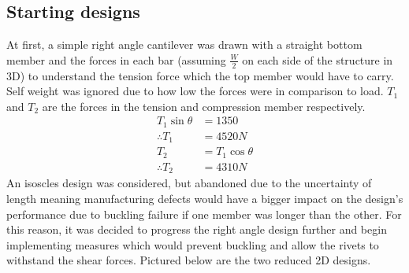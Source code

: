 \documentclass[12pt]{article}
\begin{document}
        \subsection{Starting designs}
                At first, a simple right angle cantilever was drawn with a straight bottom member and the forces in each bar (assuming $\frac{W}{2}$ on each side of the structure in 3D)
                to understand the tension force which the top member would have to carry. Self weight was ignored due to how low the forces were in comparison to load. $T_1$ and $T_2$
                are the forces in the tension and compression member respectively.
                \begin{align}
                    T_1 \sin \theta &= 1350 \\
                    \nonumber \therefore T_1 &= 4520 N \\
                    \nonumber T_2 &= T_1 \cos \theta \\
                    \nonumber \therefore T_2 &= 4310 N
                \end{align}
                An isoscles design was considered, but abandoned due to the uncertainty of length meaning manufacturing defects would have a bigger impact on the design's performance
                due to buckling failure if one member was longer than the other. For this reason, it was decided to progress the right angle design further and begin implementing measures
                which would prevent buckling and allow the rivets to withstand the shear forces. Pictured below are the two reduced 2D designs.
\end{document}
